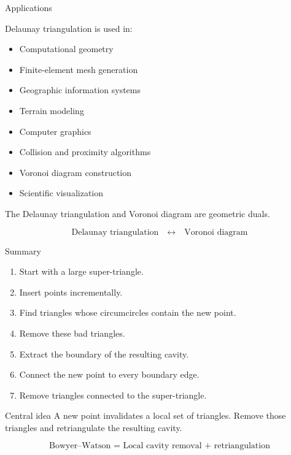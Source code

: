 \documentclass[aspectratio=169]{beamer}
\begin{document}
\begin{frame}{Applications}

Delaunay triangulation is used in:

\begin{itemize}
    \item Computational geometry
    \item Finite-element mesh generation
    \item Geographic information systems
    \item Terrain modeling
    \item Computer graphics
    \item Collision and proximity algorithms
    \item Voronoi diagram construction
    \item Scientific visualization
\end{itemize}

\vspace{0.3cm}

The Delaunay triangulation and Voronoi diagram are geometric duals.

\[
\boxed{
\text{Delaunay triangulation}
\quad\longleftrightarrow\quad
\text{Voronoi diagram}
}
\]

\end{frame}

\begin{frame}{Summary}

\begin{enumerate}
    \item Start with a large super-triangle.
    \item Insert points incrementally.
    \item Find triangles whose circumcircles contain the new point.
    \item Remove these bad triangles.
    \item Extract the boundary of the resulting cavity.
    \item Connect the new point to every boundary edge.
    \item Remove triangles connected to the super-triangle.
\end{enumerate}

\vspace{0.4cm}

\begin{block}{Central idea}
A new point invalidates a local set of triangles. Remove those
triangles and retriangulate the resulting cavity.
\end{block}

\[
\boxed{\text{Bowyer--Watson = Local cavity removal + retriangulation}}
\]

\end{frame}
\end{document}
